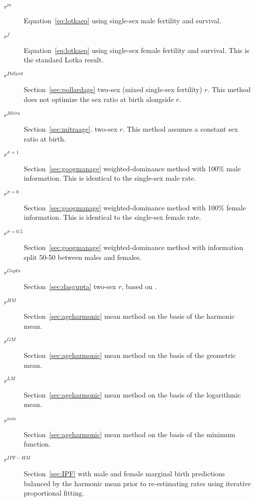 \begin{description}
  \item[$r^m$] Equation~\eqref{eq:lotkaeq} using single-sex male fertility and
  survival.
  \item[$r^f$] Equation~\eqref{eq:lotkaeq} using single-sex female fertility and
  survival. This is the standard Lotka result.
  \item[$r^{Pollard}$] Section~\ref{sec:pollardage} two-sex (mixed single-sex
  fertility) $r$. This method does not optimize the sex ratio at birth alongside $r$.
  \item[$r^{Mitra}$] Section~\ref{sec:mitraage}. two-sex $r$. This method
  assumes a constant sex ratio at birth.
  \item[$r^{\sigma=1}$] Section~\ref{sec:googmanage} weighted-dominance
  method with 100\% male information. This is identical to the single-sex male rate.
  \item[$r^{\sigma=0}$] Section~\ref{sec:googmanage} weighted-dominance
  method with 100\% female information. This is identical to the single-sex female rate.
  \item[$r^{\sigma=0.5}$] Section~\ref{sec:googmanage} weighted-dominance
  method with information split 50-50 between males and females.
  \item[$r^{Gupta}$] Section~\ref{sec:dasgupta} two-sex $r$, based on
  \citet{gupta1978alternative}.
  \item[$r^{HM}$] Section~\ref{sec:ageharmonic} mean method on the basis of
  the harmonic mean.
  \item[$r^{GM}$] Section~\ref{sec:ageharmonic} mean method on the basis of
  the geometric mean.
  \item[$r^{LM}$] Section~\ref{sec:ageharmonic} mean method on the basis of
  the logarithmic mean.
  \item[$r^{min}$] Section~\ref{sec:ageharmonic} mean method on the basis
  of the minimum function.
  \item[$r^{IPF-HM}$] Section~\ref{sec:IPF} with male and female marginal
  birth predictions balanced by the harmonic mean prior to re-estimating rates
  using iterative proportional fitting.
\end{description}

